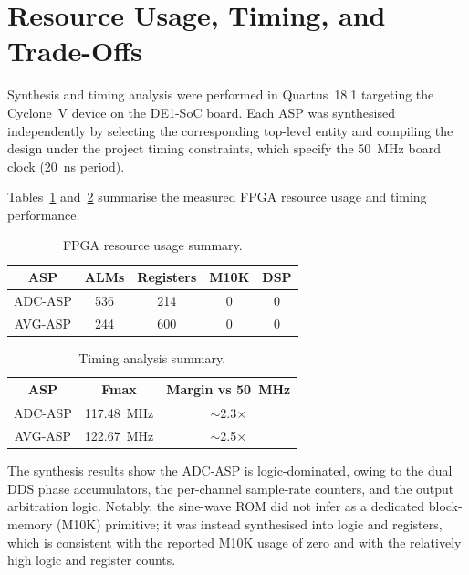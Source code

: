 \documentclass[10pt, a4paper]{article}
\begin{document}
\section{Resource Usage, Timing, and Trade-Offs}
\label{sec:resources}

Synthesis and timing analysis were performed in Quartus~18.1 targeting the Cyclone~V device on the DE1-SoC board. Each ASP was synthesised independently by selecting the corresponding top-level entity and compiling the design under the project timing constraints, which specify the 50~MHz board clock (20~ns period).

Tables~\ref{tab:resources} and~\ref{tab:fmax} summarise the measured FPGA resource usage and timing performance.

\begin{table}[ht]
\centering
    \caption{FPGA resource usage summary.}
    \label{tab:resources}
    \begin{tabular}{|c|c|c|c|c|}
        \hline
        \textbf{ASP}    & \textbf{ALMs} & \textbf{Registers} & \textbf{M10K} & \textbf{DSP} \\ \hline
        ADC-ASP         & 536           & 214                & 0             & 0            \\ \hline
        AVG-ASP         & 244           & 600                & 0             & 0            \\ \hline
    \end{tabular}
\end{table}

\begin{table}[ht]
\centering
    \caption{Timing analysis summary.}
    \label{tab:fmax}
    \begin{tabular}{|c|c|c|}
    \hline
    \textbf{ASP}    & \textbf{Fmax} & \textbf{Margin vs 50~MHz} \\ \hline
    ADC-ASP         & 117.48~MHz    & $\sim$2.3$\times$         \\ \hline
    AVG-ASP         & 122.67~MHz    & $\sim$2.5$\times$         \\ \hline
    \end{tabular}
\end{table}

The synthesis results show the ADC-ASP is logic-dominated, owing to the dual DDS phase accumulators, the per-channel sample-rate counters, and the output arbitration logic. Notably, the sine-wave ROM did not infer as a dedicated block-memory (M10K) primitive; it was instead synthesised into logic and registers, which is consistent with the reported M10K usage of zero and with the relatively high logic and register counts.
\end{document}
